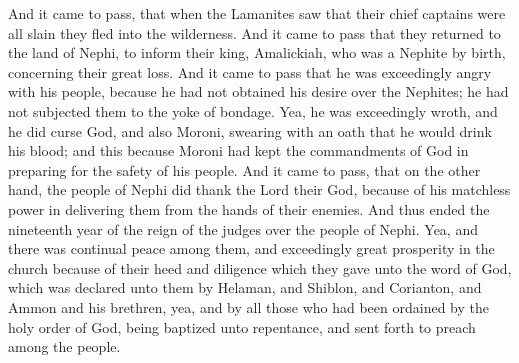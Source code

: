 \bverse \iffalse And it came to pass, that when the Lamanites saw that their chief captains were all slain they fled into the wilderness. And it came to pass that they returned to the land of Nephi, to inform their king, Amalickiah, who was a Nephite by birth, concerning their great loss. \fi
And it came to pass, that when the Lamanites saw that their chief captains were all slain they fled into the wilderness. And it came to pass that they returned to the land of Nephi, to inform their king, Amalickiah, who was a Nephite by birth, concerning their great loss.
\bverse \iffalse And it came to pass that he was exceedingly angry with his people, because he had not obtained his desire over the Nephites; he had not subjected them to the yoke of bondage. \fi
And it came to pass that he was exceedingly angry with his people, because he had not obtained his desire over the Nephites; he had not subjected them to the yoke of bondage.
\bverse \iffalse Yea, he was exceedingly wroth, and he did curse God, and also Moroni, swearing with an oath that he would drink his blood; and this because Moroni had kept the commandments of God in preparing for the safety of his people. \fi
Yea, he was exceedingly wroth, and he did curse God, and also Moroni, swearing with an oath that he would drink his blood; and this because Moroni had kept the commandments of God in preparing for the safety of his people.
\bverse \iffalse And it came to pass, that on the other hand, the people of Nephi did thank the Lord their God, because of his matchless power in delivering them from the hands of their enemies. \fi
And it came to pass, that on the other hand, the people of Nephi did thank the Lord their God, because of his matchless power in delivering them from the hands of their enemies.
\bverse \iffalse And thus ended the nineteenth year of the reign of the judges over the people of Nephi. \fi
And thus ended the nineteenth year of the reign of the judges over the people of Nephi.
\bverse \iffalse Yea, and there was continual peace among them, and exceedingly great prosperity in the church because of their heed and diligence which they gave unto the word of God, which was declared unto them by Helaman, and Shiblon, and Corianton, and Ammon and his brethren, yea, and by all those who had been ordained by the holy order of God, being baptized unto repentance, and sent forth to preach among the people. \fi
Yea, and there was continual peace among them, and exceedingly great prosperity in the church because of their heed and diligence which they gave unto the word of God, which was declared unto them by Helaman, and Shiblon, and Corianton, and Ammon and his brethren, yea, and by all those who had been ordained by the holy order of God, being baptized unto repentance, and sent forth to preach among the people.
